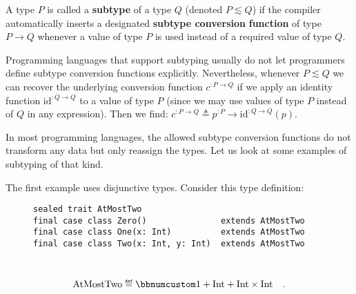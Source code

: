 A type $P$ is called a \textbf{subtype}
of a type $Q$ (denoted $P\lesssim Q$) if the compiler automatically
inserts a designated
\textbf{subtype conversion} \textbf{function} of type $P\rightarrow Q$
whenever a value of type $P$ is used instead of a required value
of type $Q$. 

Programming languages that support subtyping usually do not let programmers
define subtype conversion functions explicitly. Nevertheless, whenever
$P\lesssim Q$ we can recover the underlying conversion function $c^{:P\rightarrow Q}$
if we apply an identity function $\text{id}^{:Q\rightarrow Q}$ to
a value of type $P$ (since we may use values of type $P$ instead
of $Q$ in any expression). Then we find: $c^{:P\rightarrow Q}\triangleq p^{:P}\rightarrow\text{id}^{:Q\rightarrow Q}(p)$.

In most programming languages, the allowed subtype conversion functions
do not transform any data but only reassign the types. Let us look
at some examples of subtyping of that kind. 

The first example uses disjunctive types. Consider this type definition:

\begin{wrapfigure}{l}{0.56\columnwidth}%
\vspace{-0.9\baselineskip}

\begin{lstlisting}
sealed trait AtMostTwo
final case class Zero()               extends AtMostTwo
final case class One(x: Int)          extends AtMostTwo
final case class Two(x: Int, y: Int)  extends AtMostTwo
\end{lstlisting}

\vspace{-0.8\baselineskip}
\end{wrapfigure}%

~\vspace{-0.6\baselineskip}
\[
\text{AtMostTwo}\triangleq\bbnum 1+\text{Int}+\text{Int}\times\text{Int}\quad.
\]

